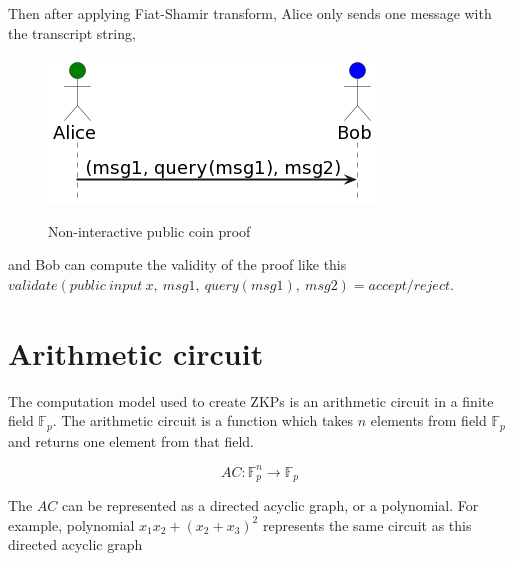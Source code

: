 Then after applying Fiat-Shamir transform, Alice only sends one message with
the transcript string,
\begin{figure}[h]
    \centering
    \includegraphics[scale=0.6]{assets/images/non_interactive_coin.png}
    \caption{Non-interactive public coin proof}
    \label{fig:non_interactive_coin}
	\cite{Fiat, youtubeMOOCLecture1}
    \vspace{0.5cm}
\end{figure}
and Bob can compute the validity of the proof like this
$validate(public\:input\:x,\:msg1,\:query(msg1),\:msg2) = accept/reject$.

\section{Arithmetic circuit}

The computation model used to create ZKPs is an arithmetic circuit in a
finite field $\mathbb{F}_p$. The arithmetic circuit is a function which takes
$n$ elements from field $\mathbb{F}_p$ and returns one element from that field.

\[AC: \mathbb{F}_p^n \rightarrow \mathbb{F}_p \]

The $AC$ can be represented as a directed acyclic graph, or a polynomial. For
example, polynomial $x_1x_2 + (x_2 + x_3)^2$ represents the same circuit as this
directed acyclic graph

